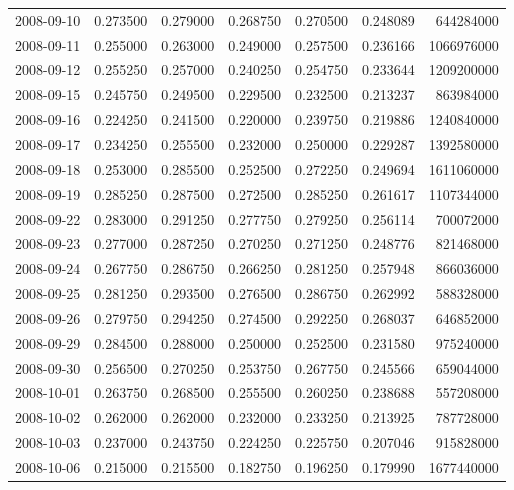 \begin{tabular}{lrrrrrr}
2008-09-10 &    0.273500 &    0.279000 &    0.268750 &    0.270500 &    0.248089 &   644284000 \\
2008-09-11 &    0.255000 &    0.263000 &    0.249000 &    0.257500 &    0.236166 &  1066976000 \\
2008-09-12 &    0.255250 &    0.257000 &    0.240250 &    0.254750 &    0.233644 &  1209200000 \\
2008-09-15 &    0.245750 &    0.249500 &    0.229500 &    0.232500 &    0.213237 &   863984000 \\
2008-09-16 &    0.224250 &    0.241500 &    0.220000 &    0.239750 &    0.219886 &  1240840000 \\
2008-09-17 &    0.234250 &    0.255500 &    0.232000 &    0.250000 &    0.229287 &  1392580000 \\
2008-09-18 &    0.253000 &    0.285500 &    0.252500 &    0.272250 &    0.249694 &  1611060000 \\
2008-09-19 &    0.285250 &    0.287500 &    0.272500 &    0.285250 &    0.261617 &  1107344000 \\
2008-09-22 &    0.283000 &    0.291250 &    0.277750 &    0.279250 &    0.256114 &   700072000 \\
2008-09-23 &    0.277000 &    0.287250 &    0.270250 &    0.271250 &    0.248776 &   821468000 \\
2008-09-24 &    0.267750 &    0.286750 &    0.266250 &    0.281250 &    0.257948 &   866036000 \\
2008-09-25 &    0.281250 &    0.293500 &    0.276500 &    0.286750 &    0.262992 &   588328000 \\
2008-09-26 &    0.279750 &    0.294250 &    0.274500 &    0.292250 &    0.268037 &   646852000 \\
2008-09-29 &    0.284500 &    0.288000 &    0.250000 &    0.252500 &    0.231580 &   975240000 \\
2008-09-30 &    0.256500 &    0.270250 &    0.253750 &    0.267750 &    0.245566 &   659044000 \\
2008-10-01 &    0.263750 &    0.268500 &    0.255500 &    0.260250 &    0.238688 &   557208000 \\
2008-10-02 &    0.262000 &    0.262000 &    0.232000 &    0.233250 &    0.213925 &   787728000 \\
2008-10-03 &    0.237000 &    0.243750 &    0.224250 &    0.225750 &    0.207046 &   915828000 \\
2008-10-06 &    0.215000 &    0.215500 &    0.182750 &    0.196250 &    0.179990 &  1677440000 \\

\end{tabular}
